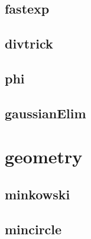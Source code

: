 \vspace{-2pt}
\subsection{fastexp}
\vspace{-5pt}
\raggedbottom
\hrulefill

\vspace{-2pt}
\subsection{divtrick}
\vspace{-5pt}
\raggedbottom
\hrulefill

\vspace{-2pt}
\subsection{phi}
\vspace{-5pt}
\raggedbottom
\hrulefill

\vspace{-2pt}
\subsection{gaussianElim}
\vspace{-5pt}
\raggedbottom
\hrulefill


\section{geometry}
\vspace{-2pt}
\subsection{minkowski}
\vspace{-5pt}
\raggedbottom
\hrulefill

\vspace{-2pt}
\subsection{mincircle}
\vspace{-5pt}
\raggedbottom
\hrulefill

